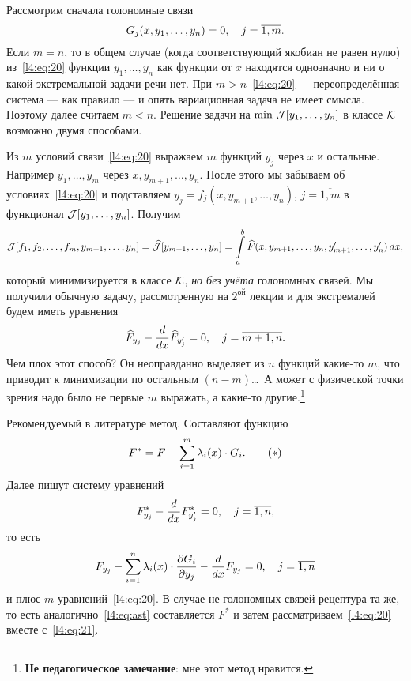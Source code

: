 \begin{enumerateD}
	Рассмотрим сначала голономные связи
	\begin{equation}
		\label{l4:eq:20}
		\hfill G_j(x,y_1,\ldots,y_n)=0,\quad j=\overline{1,m}.\hfill
	\end{equation}
	Если $m=n$, то в общем случае (когда соответствующий якобиан не равен нулю) из~\eqref{l4:eq:20} функции $y_1,\ldots,y_n$ как функции от $x$ находятся однозначно и ни о какой экстремальной задачи речи нет. При $m>n$~\eqref{l4:eq:20} --- переопределённая система --- как правило --- и опять вариационная задача не имеет смысла. Поэтому далее считаем $m<n$. Решение задачи на $\min\,\mathcal{J}[y_1,\ldots,y_n]$ в классе $\mathcal{K}$ возможно двумя способами. 
	\begin{enumerateD}
		\item Из $m$ условий связи~\eqref{l4:eq:20} выражаем $m$ функций $y_j$ через $x$ и остальные. Например $y_1,\ldots,y_m$ через $x,y_{m+1},\ldots,y_n$. После этого мы забываем об условиях~\eqref{l4:eq:20} и подставляем $y_j=f_j(x,y_{m+1},\ldots,y_{n})$, $j=\overline{1,m}$ в функционал $\mathcal{J}[y_1,\ldots,y_n]$. Получим
		\begin{equation*}
			\mathcal{J}[f_1,f_2,\ldots,f_m,y_{m+1},\ldots,y_n]=\widehat{\mathcal{J}}[y_{m+1},\ldots,y_n]=\int\limits_a^b \widehat{F}(x,y_{m+1},\ldots,y_n,y'_{m+1},\ldots,y'_n)\,dx,
		\end{equation*}  
		который минимизируется в классе $\mathcal{K}$, \emph{но без учёта} голономных связей. Мы получили обычную задачу, рассмотренную на $2^{\text{ой}}$ лекции и для экстремалей будем иметь уравнения
		\begin{equation*}
			\hfill \widehat{F}_{y_j}-\der{}{x}\widehat{F}_{y'_j}=0,\quad j=\overline{m+1,n}.\hfill
		\end{equation*} 
		Чем плох этот способ? Он неоправданно выделяет из $n$ функций какие-то $m$, что приводит к минимизации по остальным $(n-m)$\dots\  А может с физической точки зрения надо было не первые $m$ выражать, а какие-то другие.\footnote{\textbf{Не педагогическое замечание}: мне этот метод нравится.}
		\item Рекомендуемый в литературе метод. Составляют функцию
		\begin{equation}
			\label{l4:eq:ast}
			\hfill F^{\ast}=F-\sum\limits_{i=1}^{m}\lambda_i(x)\cdot G_i.\tag{$\ast$}\hfill
		\end{equation} 
		Далее пишут систему уравнений
		\begin{equation}
			\label{l4:eq:21}
			\hfill F^{\ast}_{y_j}-\der{}{x}F^{\ast}_{y'_j}=0,\quad j=\overline{1,n},\hfill
		\end{equation}
		то есть 
		\begin{equation*}
			\hfill F_{y_j}-\sum\limits_{i=1}^n\lambda_i(x)\cdot\pder{G_i}{y_j}-\der{}{x}F_{y_j}=0,\quad j=\overline{1,n}\hfill
		\end{equation*}
		и плюс $m$ уравнений~\eqref{l4:eq:20}.
		В случае не голономных связей рецептура та же, то есть аналогично~\eqref{l4:eq:ast} составляется $	F^{\ast}$ и затем рассматриваем~\eqref{l4:eq:20} вместе с~\eqref{l4:eq:21}.
	\end{enumerateD}
\end{enumerateD}

